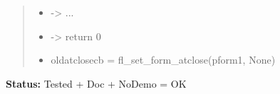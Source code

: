 \begin{boxedminipage}{\funcwidth}
\begin{quote}
\begin{itemize}
  \item {\textbar}-{\textgreater}{\textbar} ...



  \item {\textbar}-{\textgreater}{\textbar} return 0



  \item oldatclosecb = fl\_set\_form\_atclose(pform1, None)



\end{itemize}

\end{quote}

\textbf{Status:} Tested + Doc + NoDemo = OK



    \end{boxedminipage}

    \label{xformslib:flbasic:fl_set_atclose}

    \vspace{0.5ex}

